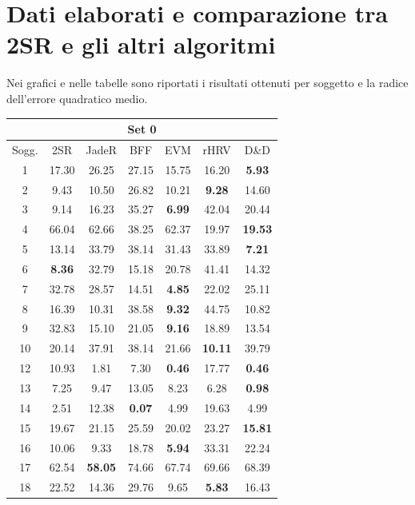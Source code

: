 \documentclass[journal,A4paper,compsoc,epsfig]{IEEEtran}
\begin{document}
  \appendix
  \section{Dati elaborati e comparazione tra 2SR e gli altri algoritmi}
    \label{appendix:DatiElaborati}
    Nei grafici e nelle tabelle sono riportati i risultati ottenuti per soggetto e la radice dell'errore quadratico medio.
    
    \begin{table}
      \begin{tabular}{|c||c|c|c|c|c|c|}
        \hline
        \multicolumn{7}{|c|}{Set 0} \\ \hline
        Sogg. &2SR &JadeR &BFF &EVM &rHRV &D\&D \\ \hline
        1 &17.30 &26.25 &27.15 &15.75 &16.20 &\textbf{5.93} \\ \hline
        2 &9.43 &10.50 &26.82 &10.21 &\textbf{9.28} &14.60 \\ \hline
        3 &9.14 &16.23 &35.27 &\textbf{6.99} &42.04 &20.44 \\ \hline
        4 &66.04 &62.66 &38.25 &62.37 &19.97 &\textbf{19.53} \\ \hline
        5 &13.14 &33.79 &38.14 &31.43 &33.89 &\textbf{7.21} \\ \hline
        6 &\textbf{8.36} &32.79 &15.18 &20.78 &41.41 &14.32 \\ \hline
        7 &32.78 &28.57 &14.51 &\textbf{4.85} &22.02 &25.11 \\ \hline
        8 &16.39 &10.31 &38.58 &\textbf{9.32} &44.75 &10.82 \\ \hline
        9 &32.83 &15.10 &21.05 &\textbf{9.16} &18.89 &13.54 \\ \hline
        10 &20.14 &37.91 &38.14 &21.66 &\textbf{10.11} &39.79 \\ \hline
        12 &10.93 &1.81 &7.30 &\textbf{0.46} &17.77 &\textbf{0.46} \\ \hline
        13 &7.25 &9.47 &13.05 &8.23 &6.28 &\textbf{0.98} \\ \hline
        14 &2.51 &12.38 &\textbf{0.07} &4.99 &19.63 &4.99 \\ \hline
        15 &19.67 &21.15 &25.59 &20.02 &23.27 &\textbf{15.81} \\ \hline
        16 &10.06 &9.33 &18.78 &\textbf{5.94} &33.31 &22.24 \\ \hline
        17 &62.54 &\textbf{58.05} &74.66 &67.74 &69.66 &68.39 \\ \hline
        18 &22.52 &14.36 &29.76 &9.65 &\textbf{5.83} &16.43 \\ \hline

\end{tabular}
\end{table}
\end{document}
